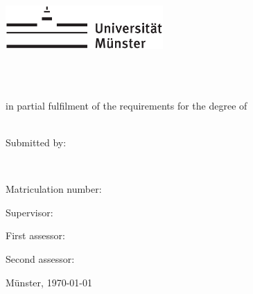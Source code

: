 \begin{centering}
\vspace*{\fill}
\includegraphics[width=6cm]{./img/Logo_UniMuenster_2023_100K.pdf}

\vspace{1.5cm} 

{\LARGE
	\textbf{\printtitle}\\[1.5cm]
}

{\large
	\large
    \textsc{\printtype} \\
    	\normalsize
	in partial fulfilment of the requirements for the degree of\\
	\large
    \textsc{\printdegree} \\[2cm]
}

{\large
	Submitted by:
}

{ \Large
	\textbf{\printname}\\[1cm]
}

{\large
	Matriculation number: \printnumber\\[1cm]
}

\end{centering}

\par
\vspace*{2ex}
Supervisor:\\
\large
\textit{\printsupervisor}

\par
\normalsize
\vspace*{1ex}
First assessor:\\
\large
\textit{\printfirstassessor}

\par
\normalsize
\vspace*{0.5ex}
Second assessor:\\
\large
\textit{\printsecondassessor}

{\large
Münster, \today
}
\vfill
